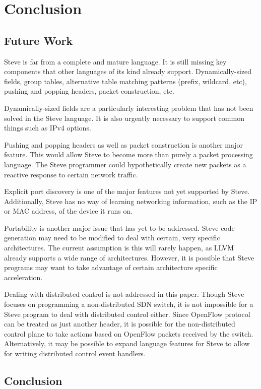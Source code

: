 \chapter{ Conclusion} \label{ch:conclusion}

\section{Future Work}

Steve is far from a complete and mature language. It is still missing key components that other languages of its kind already support. Dynamically-sized fields, group tables, alternative table matching patterns (prefix, wildcard, etc), pushing and popping headers, packet construction, etc.

Dynamically-sized fields are a particularly interesting problem that has not been solved in the Steve language. It is also urgently necessary to support common things such as IPv4 options.

Pushing and popping headers as well as packet construction is another major feature. This would allow Steve to become more than purely a packet processing language. The Steve programmer could hypothetically create new packets as a reactive response to certain network traffic.

Explicit port discovery is one of the major features not yet supported by Steve. Additionally, Steve has no way of learning networking information, such as the IP or MAC address, of the device it runs on.

Portability is another major issue that has yet to be addressed. Steve code generation may need to be modified to deal with certain, very specific architectures. The current assumption is this will rarely happen, as LLVM already supports a wide range of architectures. However, it is possible that Steve programs may want to take advantage of certain architecture specific acceleration.

Dealing with distributed control is not addressed in this paper. Though Steve focuses on programming a non-distributed SDN switch, it is not impossible for a Steve program to deal with distributed control either. Since OpenFlow protocol can be treated as just another header,
it is possible for the non-distributed control plane to take actions based on OpenFlow packets received by the switch. Alternatively, it may be possible to expand language features for Steve to allow for writing distributed control event handlers.

\section{Conclusion}

